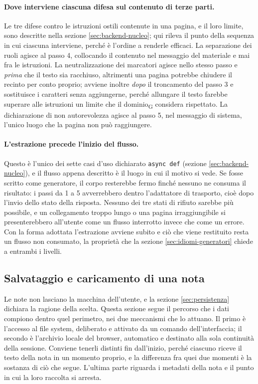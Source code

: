 \documentclass[a4paper, 10pt]{article}
\begin{document}
\paragraph{Dove interviene ciascuna difesa sul contenuto di terze parti.}
Le tre difese contro le istruzioni ostili contenute in una pagina, e il loro limite, sono descritte nella sezione \ref{sec:backend-nucleo}; qui rileva il punto della sequenza in cui ciascuna interviene, perché è l'ordine a renderle efficaci. La separazione dei ruoli agisce al passo 4, collocando il contenuto nel messaggio del materiale e mai fra le istruzioni. La neutralizzazione dei marcatori agisce nello stesso passo e \textit{prima} che il testo sia racchiuso, altrimenti una pagina potrebbe chiudere il recinto per conto proprio; avviene inoltre \textit{dopo} il troncamento del passo 3 e sostituisce i caratteri senza aggiungerne, perché allungare il testo farebbe superare alle istruzioni un limite che il dominio\textsubscript{G} considera rispettato. La dichiarazione di non autorevolezza agisce al passo 5, nel messaggio di sistema, l'unico luogo che la pagina non può raggiungere.

\paragraph{L'estrazione precede l'inizio del flusso.}
Questo è l'unico dei sette casi d'uso dichiarato \texttt{async def} (sezione \ref{sec:backend-nucleo}), e il flusso appena descritto è il luogo in cui il motivo si vede. Se fosse scritto come generatore, il corpo resterebbe fermo finché nessuno ne consuma il risultato: i passi da 1 a 5 avverrebbero dentro l'adattatore di trasporto, cioè dopo l'invio dello stato della risposta. Nessuno dei tre stati di rifiuto sarebbe più possibile, e un collegamento troppo lungo o una pagina irraggiungibile si presenterebbero all'utente come un flusso interrotto invece che come un errore. Con la forma adottata l'estrazione avviene subito e ciò che viene restituito resta un flusso non consumato, la proprietà che la sezione \ref{sec:idiomi-generatori} chiede a entrambi i livelli.

\subsection{Salvataggio e caricamento di una nota}
\label{sec:flusso-persistenza}

Le note non lasciano la macchina dell'utente, e la sezione \ref{sec:persistenza} dichiara la ragione della scelta. Questa sezione segue il percorso che i dati compiono dentro quel perimetro, nei due meccanismi che lo attuano. Il primo è l'accesso al file system, deliberato e attivato da un comando dell'interfaccia; il secondo è l'archivio locale del browser, automatico e destinato alla sola continuità della sessione. Conviene tenerli distinti fin dall'inizio, perché ciascuno riceve il testo della nota in un momento proprio, e la differenza fra quei due momenti è la sostanza di ciò che segue. L'ultima parte riguarda i metadati della nota e il punto in cui la loro raccolta si arresta.
\end{document}
